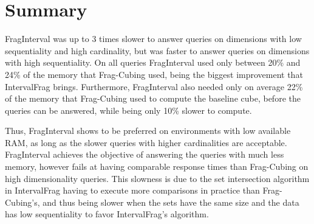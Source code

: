 \section{Summary}\label{ch:interval:summary}

FragInterval was up to 3 times slower to answer queries on dimensions with low sequentiality and high cardinality, but was faster to answer queries on dimensions with high sequentiality.
On all queries FragInterval used only between 20\% and 24\% of the memory that Frag-Cubing used, being the biggest improvement that IntervalFrag brings.
Furthermore, FragInterval also needed only on average 22\% of the memory that Frag-Cubing used to compute the baseline cube, before the queries can be answered, while being only 10\% slower to compute.

Thus, FragInterval shows to be preferred on environments with low available RAM, as long as the slower queries with higher cardinalities are acceptable.
FragInterval achieves the objective of answering the queries with much less memory, however fails at having comparable response times than Frag-Cubing on high dimensionality queries.
This slowness is due to the set intersection algorithm in IntervalFrag having to execute more comparisons in practice than Frag-Cubing's, and thus being slower when the sets have the same size and the data has low sequentiality to favor IntervalFrag's algorithm.

